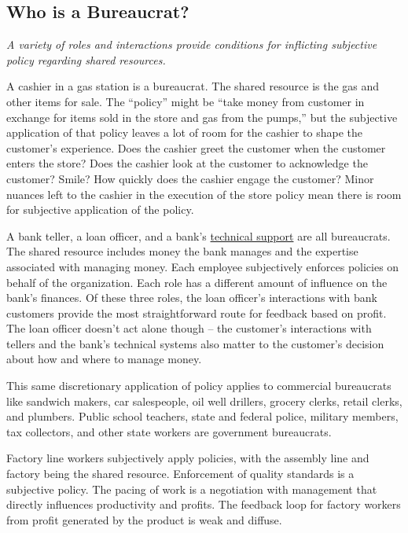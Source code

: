 \subsection*{Who is a Bureaucrat?}
\textit{A variety of roles and interactions provide conditions for inflicting subjective policy regarding shared resources.} 

A cashier in a gas station is a bureaucrat. 
The shared resource is the gas and other items for sale. The ``policy'' might be ``take money from customer in exchange for items sold in the store and gas from the pumps,'' but the subjective application of that policy leaves a lot of room for the cashier to shape the customer's experience. Does the cashier greet the customer when the customer enters the store? Does the cashier look at the customer to acknowledge the customer? Smile? How quickly does the cashier engage the customer? Minor nuances left to the cashier in the execution of the store policy mean there is room for subjective application of the policy. 

A bank teller, a loan officer, and a bank's \href{https://en.wikipedia.org/wiki/Technical_support}{technical support} 
\iftoggle{WPinmargin}{\marginpar{$>$Wikipedia: Technical support}}{}
are all bureaucrats. 
The shared resource includes money the bank manages and the expertise associated with managing money. Each employee subjectively enforces policies on behalf of the organization. Each role has a different amount of influence on the bank's finances. Of these three roles, the loan officer's interactions with bank customers provide the most straightforward route for feedback based on profit. The loan officer doesn't act alone though -- the customer's interactions with tellers and the bank's technical systems also matter to the customer's decision about how and where to manage money. 


This same discretionary application of policy applies to commercial bureaucrats like sandwich makers, car salespeople, oil well drillers, grocery clerks, retail clerks, 
and plumbers. Public school teachers, state and federal police, 
military members, 
tax collectors, and other state workers are government bureaucrats. 


Factory line workers subjectively apply policies, with the assembly line and factory being the shared resource. Enforcement of quality standards is a subjective policy. The pacing of work is a negotiation with management that directly influences productivity and profits. The feedback loop for factory workers from profit generated by the product is weak and diffuse. %

